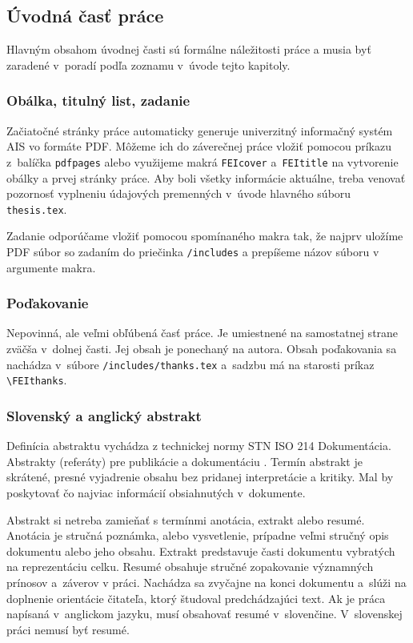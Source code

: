 \subsection{Úvodná časť práce}
Hlavným obsahom úvodnej časti sú formálne náležitosti práce a musia byť zaradené v~poradí podľa zoznamu v~úvode tejto kapitoly.

\subsubsection{Obálka, titulný list, zadanie}
Začiatočné stránky práce automaticky generuje univerzitný
informačný systém AIS vo formáte PDF.
Môžeme ich do záverečnej práce vložiť pomocou príkazu \verb|| z~balíčka \verb|pdfpages| 
alebo využijeme makrá \verb|FEIcover| a~\verb|FEItitle| na vytvorenie obálky a prvej 
stránky práce.
Aby boli všetky informácie aktuálne,
treba venovať pozornosť vyplneniu údajových 
premenných v~úvode hlavného súboru \verb|thesis.tex|. 

Zadanie odporúčame vložiť pomocou spomínaného makra 
\verb|| tak, že najprv uložíme PDF súbor 
so zadaním do priečinka \verb|/includes| a prepíšeme 
názov súboru v argumente makra.

\subsubsection{Poďakovanie}
Nepovinná, ale veľmi obľúbená časť práce.
Je umiestnené na samostatnej strane zväčša v~dolnej časti.
Jej obsah je ponechaný na autora. 
Obsah poďakovania sa nachádza v~súbore 
\verb|/includes/thanks.tex| a~sadzbu má na starosti 
príkaz \verb|\FEIthanks|.

\subsubsection{Slovenský a anglický abstrakt}
Definícia abstraktu vychádza z technickej normy STN ISO 214 Dokumentácia.
Abstrakty (referáty) pre publikácie a dokumentáciu \cite{iso214}.
Termín abstrakt je skrátené, presné vyjadrenie obsahu
bez pridanej interpretácie a kritiky.
Mal by poskytovať čo najviac informácií obsiahnutých v~dokumente.

Abstrakt si netreba zamieňať s termínmi anotácia,
extrakt alebo resumé.
Anotácia je stručná poznámka, alebo vysvetlenie,
prípadne veľmi stručný opis dokumentu alebo jeho obsahu.
Extrakt predstavuje časti dokumentu vybratých
na reprezentáciu celku.
Resumé obsahuje stručné zopakovanie významných prínosov
a~záverov v práci.
Nachádza sa zvyčajne na konci dokumentu
a~slúži na doplnenie orientácie čitateľa,
ktorý študoval predchádzajúci text.
Ak je práca napísaná v~anglickom jazyku,
musí obsahovať resumé v~slovenčine.
V~slovenskej práci nemusí byť resumé.

